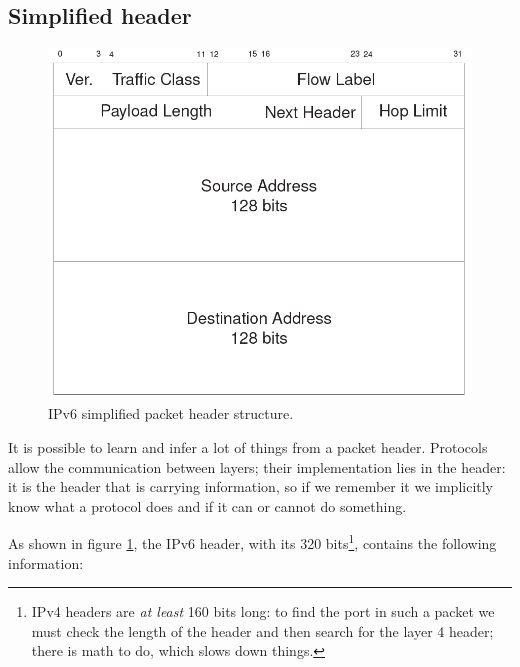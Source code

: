 
\subsection{Simplified header}
\begin{figure}[h]
    \centering
    \includegraphics[scale=0.5]{img/ipv6_header.png}
    \decoRule
    \caption{IPv6 simplified packet header structure.}
    \label{fig:ipv6_header}
\end{figure}

It is possible to learn and infer a lot of things from a packet header. Protocols allow the communication between layers; their implementation lies in the header: it is the header that is carrying information, so if we remember it we implicitly know what a protocol does and if it can or cannot do something.

As shown in figure \ref{fig:ipv6_header}, the IPv6 header, with its 320 bits\footnote{IPv4 headers are \textit{at least} 160 bits long: to find the port in such a packet we must check the length of the header and then search for the layer 4 header; there is math to do, which slows down things.}, contains the following information:

